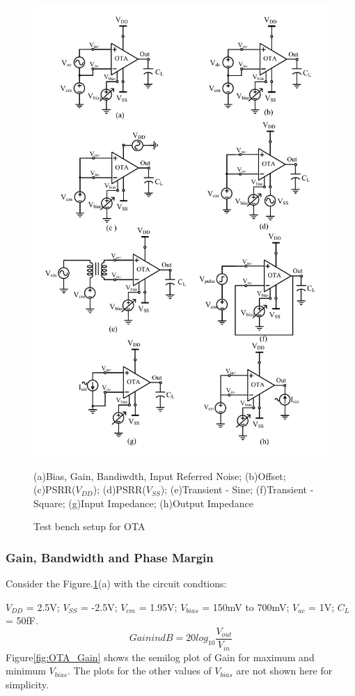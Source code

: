 \begin{figure} [H]
\centering
\includegraphics[scale=0.78]{Figures/Test_Benches/OTA_TB.pdf}
\caption{Test bench setup for OTA}
\label{fig:OTA_TB}
(a)Bias, Gain, Bandiwdth, Input Referred Noise; (b)Offset; (c)PSRR($V_{DD}$); (d)PSRR($V_{SS}$); (e)Transient - Sine; (f)Transient - Square; (g)Input Impedance; (h)Output Impedance
\end{figure}

\subsubsection{Gain, Bandwidth and Phase Margin}
Consider the Figure.\ref{fig:OTA_TB}(a) with the circuit condtions:

$V_{DD}$ = 2.5V; $V_{SS}$ = -2.5V; $V_{cm}$ = 1.95V; $V_{bias}$ = 150mV to 700mV;  $V_{ac}$ = 1V; $C_{L}$ = 50fF.
$$Gain in dB = 20 log_{10}\frac{V_{out}}{V_{in}}$$
Figure\ref{fig:OTA_Gain} shows the semilog plot of Gain for maximum and minimum $V_{bias}$. The plots for the other values of $V_{bias}$ are not shown here for simplicity.

